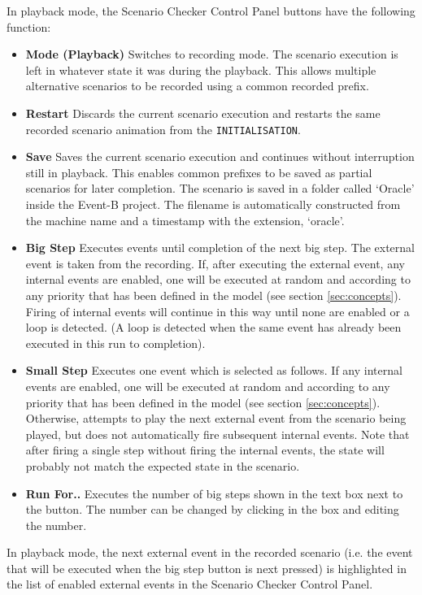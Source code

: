 In playback mode, the Scenario Checker Control Panel buttons have the following function:
\begin{itemize}
	\item \textbf{Mode (Playback)}  Switches to recording mode. The scenario execution is left in whatever state it was during the playback. This allows multiple alternative scenarios to be recorded using a common recorded prefix.
	\item \textbf{Restart}  Discards the current scenario execution and restarts the same recorded scenario animation from the \texttt{INITIALISATION}. 
	\item \textbf{Save}  Saves the current scenario execution and continues without interruption still in playback. This enables common prefixes to be saved as partial scenarios for later completion. The scenario is saved in a folder called `Oracle' inside the Event-B project. The filename is automatically constructed from the machine name and a timestamp with the extension, `oracle'. 
	\item \textbf{Big Step}  Executes events until completion of the next big step. The external event is taken from the recording. If, after executing the external event, any internal events are enabled, one will be executed at random and according to any priority that has been defined in the model (see section \ref{sec:concepts}). Firing of internal events will continue in this way until none are enabled or a loop is detected. (A loop is detected when the same event has already been executed in this run to completion).
	\item \textbf{Small Step}   Executes one event which is selected as follows. If any internal events are enabled, one will be executed at random and according to any priority that has been defined in the model (see section \ref{sec:concepts}). Otherwise, attempts to play the next external event from the scenario being played, but does not automatically fire subsequent internal events. Note that after firing a single step without firing the internal events, the state will probably not match the expected state in the scenario.
	\item \textbf{Run For..}   Executes the number of big steps shown in the text box next to the button. The number can be changed by clicking in the box and editing the number.
\end{itemize}

In playback mode, the next external event in the recorded scenario (i.e. the event that will be executed when the big step button is next pressed) is highlighted in the list of enabled external events in the Scenario Checker Control Panel.

